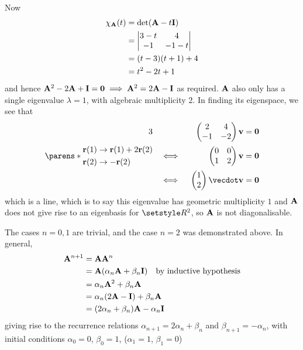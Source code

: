 \documentclass[fleqn,a4paper,11pt]{article}
\begin{document}
\begin{enumerate}[label=\textbf{\arabic*.}]
  Now
  \begin{align*}
   \chi_{\mathbf{A}}(t)
   &= \det(\mathbf{A} - t\mathbf{I}) \\
   &=
   \begin{vmatrix}
    3 - t & 4 \\
    -1 & -1 - t
   \end{vmatrix} \\
   &= (t - 3)(t + 1) + 4 \\
   &= t^2 - 2t + 1
  \end{align*}
  and hence
  \(\mathbf{A}^2 - 2\mathbf{A} + \mathbf{I} = \mathbf{0} \implies
    \mathbf{A}^2 = 2\mathbf{A} - \mathbf{I}\) as required.
  \(\mathbf{A}\) also only has a single eigenvalue \(\lambda = 1\), with algebraic
  multiplicity \(2\). In finding its eigenspace, we see that
  \begin{alignat*}3
   && &&
   \begin{pmatrix}
    2 & 4 \\
    -1 & -2
   \end{pmatrix}
   \vec v &= \vec 0 \\
   \parens*{
    \begin{aligned}
     \vec r(1) &\to \vec r(1) + 2 \vec r(2) \\
     \vec r(2) &\to -\vec r(2)
    \end{aligned}
   }&& \iff{}&&
   \begin{pmatrix}
    0 & 0 \\
    1 & 2
   \end{pmatrix}
   \vec v &= \vec 0 \\
   && \iff{}&&
   \begin{pmatrix} 1 \\ 2 \end{pmatrix} \vecdot \vec v &= \vec 0
  \end{alignat*}
  which is a line, which is to say this eigenvalue has geometric multiplicity
  \(1\) and \(\mathbf{A}\) does not give rise to an eigenbasis for \(\Reals^2\), so
  \(\mathbf{A}\) is not diagonalisable.

  The cases \(n = 0, 1\) are trivial, and the case \(n = 2\) was demonstrated
  above. In general,
  \begin{align*}
   \mathbf{A}^{n + 1}
   &= \mathbf{A} \mathbf{A}^n \\
   &= \mathbf{A} (\alpha_n \mathbf{A} + \beta_n \mathbf{I}) \quad
      \text{by inductive hypothesis} \\
   &= \alpha_n \mathbf{A}^2 + \beta_n \mathbf{A} \\
   &= \alpha_n (2\mathbf{A} - \mathbf{I}) + \beta_n \mathbf{A} \\
   &= (2\alpha_n + \beta_n)\mathbf{A} - \alpha_n \mathbf{I}
  \end{align*}
  giving rise to the recurrence relations
  \(\alpha_{n + 1} = 2 \alpha_n + \beta_n\) and \(\beta_{n + 1} = -\alpha_n\),
  with initial conditions
  \(\alpha_0 = 0\), \(\beta_0 = 1\), (\(\alpha_1 = 1\), \(\beta_1 = 0\))


\end{enumerate}
\end{document}
